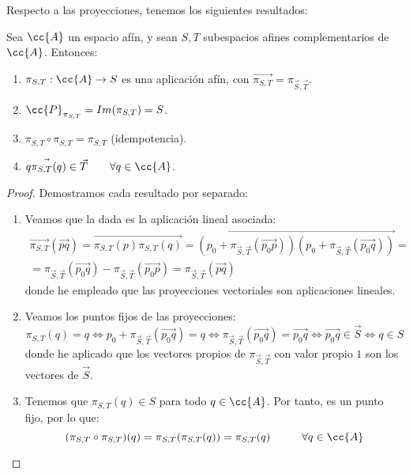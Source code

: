 Respecto a las proyecciones, tenemos los siguientes resultados:
\begin{prop}
    Sea $\cc{A}$ un espacio afín, y sean $S,T$ subespacios afines complementarios de $\cc{A}$. Entonces:
    \begin{enumerate}
        \item $\pi_{S,T}:\cc{A}\to S$ es una aplicación afín, con $\vec{\pi_{S,T}}=\pi_{\vec{S}, \vec{T}}$.
        \item $\cc{P}_{\pi_{S,T}}=Im(\pi_{S,T})=S$.
        \item $\pi_{S,T}\circ \pi_{S,T} =\pi_{S,T}$ (idempotencia).
        \item $\vec{q\pi_{S,T}(q)}\in \vec{T} \qquad \forall q\in \cc{A}$.
    \end{enumerate}
\end{prop}
\begin{proof} Demostramos cada resultado por separado:
\begin{enumerate}
    \item Veamos que la dada es la aplicación lineal asociada:
    \begin{multline*}
        \vec{\pi_{S,T}}(\vec{pq}) = \vec{\pi_{S,T}(p)\pi_{S,T}(q)} = \vec{(p_0+\pi_{\vec{S}, \vec{T}}(\vec{p_0p}))(p_0+\pi_{\vec{S}, \vec{T}}(\vec{p_0q}))} =\\= \pi_{\vec{S}, \vec{T}}(\vec{p_0q})-\pi_{\vec{S}, \vec{T}}(\vec{p_0p}) = \pi_{\vec{S}, \vec{T}}(\vec{pq})
    \end{multline*}
    donde he empleado que las proyecciones vectoriales son aplicaciones lineales.

    \item Veamos los puntos fijos de las proyecciones:
    \begin{equation*}
        \pi_{S,T}(q)=q \Longleftrightarrow p_0 + \pi_{\vec{S}, \vec{T}}(\vec{p_0q}) = q
        \Longleftrightarrow \pi_{\vec{S}, \vec{T}}(\vec{p_0q}) = \vec{p_0q}
        \Longleftrightarrow \vec{p_0q}\in \vec{S}
        \Longleftrightarrow q\in S
    \end{equation*}
    donde he aplicado que los vectores propios de $\pi_{\vec{S}, \vec{T}}$ con valor propio $1$ son los vectores de $\vec{S}$.

    \item Tenemos que $\pi_{S,T}(q)\in S$ para todo $q\in \cc{A}$. Por tanto, es un punto fijo, por lo que:
    \begin{equation*}
        (\pi_{S,T}\circ \pi_{S,T})(q) = \pi_{S,T}(\pi_{S,T}(q)) = \pi_{S,T}(q) \hspace{1cm} \forall q\in \cc{A}
    \end{equation*}


\end{enumerate}
\end{proof}
